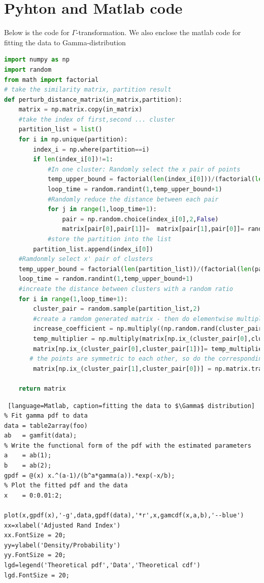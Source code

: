 \documentclass{uonmathreport}
\begin{document}
\section{ Pyhton and Matlab code } \label{app:calculations}
Below is the code for $\Gamma$-transformation. We also enclose the matlab code for fitting the data to Gamma-distribution
\begin{lstlisting}[language=Python, caption=$\Gamma$-transformation()]
import numpy as np
import random
from math import factorial
# take the similarity matrix, partition result
def perturb_distance_matrix(in_matrix,partition):
    matrix = np.matrix.copy(in_matrix)
    #take the index of first,second ... cluster
    partition_list = list()
    for i in np.unique(partition):
        index_i = np.where(partition==i)
        if len(index_i[0])!=1:
            #In one cluster: Randomly select the x pair of points
            temp_upper_bound = factorial(len(index_i[0]))/(factorial(len(index_i[0])-2)*2)
            loop_time = random.randint(1,temp_upper_bound+1)
            #Randomly reduce the distance between each pair
            for j in range(1,loop_time+1):
                pair = np.random.choice(index_i[0],2,False)
                matrix[pair[0],pair[1]]=  matrix[pair[1],pair[0]]= random.uniform(0, 1)*matrix[pair[1],pair[0]]
            #store the partition into the list
        partition_list.append(index_i[0])
    #Ramdonmly select x' pair of clusters
    temp_upper_bound = factorial(len(partition_list))/(factorial(len(partition_list)-2)*2)
    loop_time = random.randint(1,temp_upper_bound+1)
    #increate the distance between clusters with a random ratio
    for i in range(1,loop_time+1):
        cluster_pair = random.sample(partition_list,2)
        #create a ramdom generated matrix - then do elementwise multiplication
        increase_coefficient = np.multiply((np.random.rand(cluster_pair[0].shape[0],cluster_pair[1].shape[0])+1),(np.random.randint(4,size=(cluster_pair[0].shape[0],cluster_pair[1].shape[0]))+1))
        temp_multiplier = np.multiply(matrix[np.ix_(cluster_pair[0],cluster_pair[1])],increase_coefficient)
        matrix[np.ix_(cluster_pair[0],cluster_pair[1])]= temp_multiplier
       # the points are symmetric to each other, so do the corresponding changes
        matrix[np.ix_(cluster_pair[1],cluster_pair[0])] = np.matrix.transpose(temp_multiplier)

    return matrix
\end{lstlisting}
\begin{lstlisting} [language=Matlab, caption=fitting the data to $\Gamma$ distribution]
% Fit gamma pdf to data
data = table2array(foo)
ab   = gamfit(data);
% Write the functional form of the pdf with the estimated parameters
a    = ab(1);
b    = ab(2);
gpdf = @(x) x.^(a-1)/(b^a*gamma(a)).*exp(-x/b);
% Plot the fitted pdf and the data
x    = 0:0.01:2;

plot(x,gpdf(x),'-g',data,gpdf(data),'*r',x,gamcdf(x,a,b),'--blue')
xx=xlabel('Adjusted Rand Index')
xx.FontSize = 20;
yy=ylabel('Density/Probability')
yy.FontSize = 20;
lgd=legend('Theoretical pdf','Data','Theoretical cdf')
lgd.FontSize = 20;
\end{lstlisting}


\newpage



\end{document}
